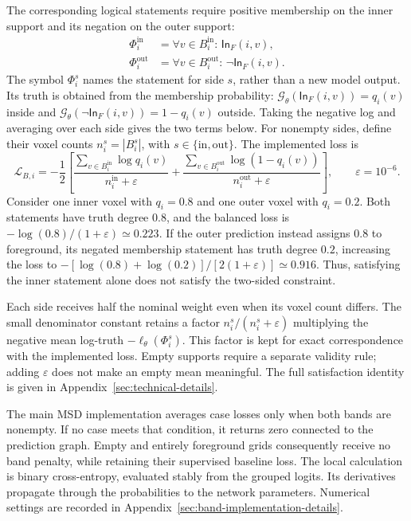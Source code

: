 \documentclass[12pt,a4paper]{article}
\begin{document}
The corresponding logical statements require positive membership on
the inner support and its negation on the outer support:
\begin{equation}
\begin{aligned}
\Phi_i^{\mathrm{in}}
 &=\forall v\in B_i^{\mathrm{in}}:\,\mathsf{In}_{F}(i,v),\\
\Phi_i^{\mathrm{out}}
 &=\forall v\in B_i^{\mathrm{out}}:\,\lnot\mathsf{In}_{F}(i,v).
\end{aligned}
\label{eq:band-logical-statements}
\end{equation}
The symbol $\Phi_i^s$ names the statement for side $s$, rather than a
new model output. Its truth is obtained from the membership probability:
$\mathcal G_\theta(\mathsf{In}_F(i,v))=q_i(v)$ inside and
$\mathcal G_\theta(\lnot\mathsf{In}_F(i,v))=1-q_i(v)$ outside.
Taking the negative log and averaging over each side gives the two terms
below. For nonempty sides, define their voxel counts
$n_i^s=|B_i^s|$, with $s\in\{\mathrm{in},\mathrm{out}\}$. The implemented loss is
\begin{equation}
\mathcal L_{B,i}=-\frac12\left[
\frac{\sum_{v\in B_i^{\mathrm{in}}}\log q_i(v)}{n_i^{\mathrm{in}}+\varepsilon}
+\frac{\sum_{v\in B_i^{\mathrm{out}}}\log(1-q_i(v))}{n_i^{\mathrm{out}}+\varepsilon}
\right],\qquad \varepsilon=10^{-6}.
\label{eq:balanced-band-loss}
\end{equation}
Consider one inner voxel with $q_i=0.8$ and one outer voxel with
$q_i=0.2$. Both statements have truth degree $0.8$, and the balanced
loss is $-\log(0.8)/(1+\varepsilon)\simeq0.223$. If the outer
prediction instead assigns $0.8$ to foreground, its negated membership
statement has truth degree $0.2$, increasing the loss to
$-[\log(0.8)+\log(0.2)]/[2(1+\varepsilon)]\simeq0.916$.
Thus, satisfying the inner statement alone does not satisfy the
two-sided constraint.

Each side receives half the nominal weight even when its voxel count
differs. The small denominator constant retains a factor
$n_i^s/(n_i^s+\varepsilon)$ multiplying the negative mean log-truth
$-\ell_\theta(\Phi_i^s)$. This factor is kept for exact correspondence
with the implemented loss. Empty supports require a separate validity
rule; adding $\varepsilon$ does not make an empty mean meaningful.
The full satisfaction identity is given in
Appendix~\ref{sec:technical-details}.

The main MSD implementation averages case losses only when both bands
are nonempty. If no case meets that condition, it returns zero connected
to the prediction graph. Empty and entirely foreground grids consequently
receive no band penalty, while retaining their supervised baseline loss.
The local calculation is binary cross-entropy, evaluated stably from
the grouped logits. Its derivatives propagate through the probabilities
to the network parameters. Numerical settings are recorded in
Appendix~\ref{sec:band-implementation-details}.
\end{document}
